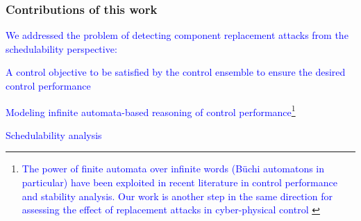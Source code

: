 \begin{frame}
\frametitle{Contributions of this work}
\tiny{\textcolor{blue}{  We addressed the problem of detecting component replacement attacks
from the schedulability perspective:}} 
\itemize 
\item \tiny{\textcolor{blue}{A control objective 
to be satisfied by the control ensemble to  ensure the desired control performance}} %


\item \tiny{\textcolor{blue}{Modeling infinite automata-based 
reasoning of control performance\footnote{ \tiny{\textcolor{blue}{ The power of finite
automata over infinite words (B\"{u}chi automatons in particular) have been exploited
in recent literature in control performance and stability analysis. Our work is another
step in the same direction for assessing the effect of replacement attacks in 
cyber-physical control }}}}}

\item \tiny{\textcolor{blue}{Schedulability analysis}} %



\end{frame}
